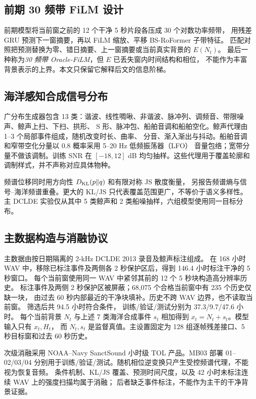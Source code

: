 \documentclass[conference]{IEEEtran}
\begin{document}
\subsection{前期 30 频带 FiLM 设计}
前期模型将当前窗之前的 12 个干净 5 秒片段各压成 30 个对数功率频带，
用残差 GRU 预测下一窗摘要，再以 FiLM 缩放、平移 BS-RoFormer 子带特征。
匹配对照把预测替换为零、错日摘要、上一窗摘要或当前真实背景的 $E(N_t)$。
最后一种称为\emph{30 频带 Oracle-FiLM}，但 $E$ 已丢失窗内时间结构和相位，
不能作为丰富背景表示的上界。本文只保留它解释后文的信息阶梯。

\subsection{海洋感知合成信号分布}
广分布生成器包含 13 类：谐波、线性啁啾、非谐波、脉冲列、调频音、带限噪声、鲸声上扫、下扫、拱形、
S 形、脉冲包、船舶音调和船舶空化。鲸声代理由 1--3 个局部事件组成，随机改变时长、曲率、
分音、渐入渐出与抖动。船舶音调和窄带空化分量以 0.8 概率采用 5--20 Hz 低频振荡器（LFO）
音量包络；宽带分量不做该调制。训练 SNR 在 $[-18,12]$ dB 均匀抽样。这些代理用于覆盖轮廓和
调制样式，并不声称对应具体物种。

频谱位移同时用方向性 $D_{\rm KL}(p\|q)$ 和有限对称 JS 散度\cite{lin1991divergence}衡量，
另报告频谱熵与信号--海洋频谱重叠。更大的 KL/JS 只代表覆盖范围更广，不等价于语义多样性。
主 DCLDE 实验仅从其中 5 类鲸声和 2 类船噪抽样，六组模型使用同一目标分布。

\subsection{主数据构造与消融协议}
主数据由按日期隔离的 2-kHz DCLDE 2013 录音及鲸声标注组成\cite{gillespie2019dclde,shiu2020marine}。
在 168 小时 WAV 中，移除已标注事件及两侧各 2 秒保护区后，得到 146.4 小时标注干净的 5 秒窗口。
每个当前窗使用同一 WAV 中紧邻其前的 12 个 5 秒块构造高分辨率历史。
标注事件及两侧 2 秒保护区被屏蔽；68,075 个合格当前窗中有 235 个历史仅缺一块，
由过去 60 秒内部最近的干净块填补。历史不跨 WAV 边界，也不读取当前窗。
筛选后共 94.5 小时符合条件，
训练/验证/测试分别为 37.3/9.7/47.6 小时。
每个当前背景 $N_t$ 与上述 7 类海洋合成事件 $s_t$ 相加得到 $x_t=N_t+s_t$。模型输入只有 $x_t,H_t$，
而 $N_t,s_t$ 是监督真值。主设置固定为 128 组逐帧残差接口、5 秒目标窗和过去 60 秒历史。

次级消融采用 NOAA--Navy SanctSound 小时级 TOL 产品\cite{noaa2020sanctsound}。MB03 部署
01--02/03/04 分别用于训练/验证/测试。随机相位逆变换只产生受控频谱代理，不能视为恢复音频。
条件机制、KL/JS 覆盖、预测时间尺度，以及 42 小时未标注连续 WAV 上的强度扫描均属于消融；
后者缺乏事件标注，不能作为主干的干净背景证据。
\end{document}
